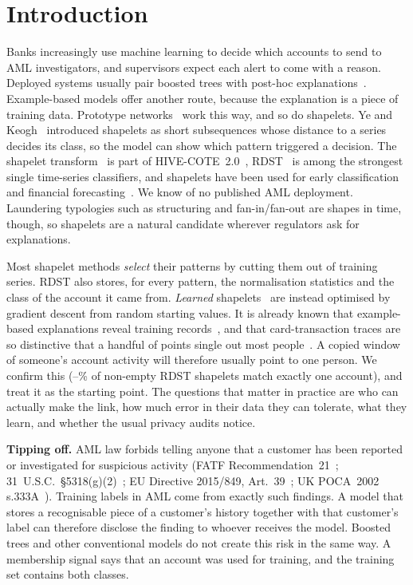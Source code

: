 \documentclass[sigconf,anonymous]{acmart}
\begin{document}
\section{Introduction}
Banks increasingly use machine learning to decide which accounts to send to AML investigators, and supervisors expect each alert to come with a reason. Deployed systems usually pair boosted trees with post-hoc explanations~\cite{tertychnyi2022}. Example-based models offer another route, because the explanation is a piece of training data. Prototype networks~\cite{chen2019} work this way, and so do shapelets. Ye and Keogh~\cite{ye2009} introduced shapelets as short subsequences whose distance to a series decides its class, so the model can show which pattern triggered a decision. The shapelet transform~\cite{hills2014} is part of HIVE-COTE~2.0~\cite{hc2}, RDST~\cite{guillaume2022} is among the strongest single time-series classifiers, and shapelets have been used for early classification~\cite{xing2011} and financial forecasting~\cite{kim2025}. We know of no published AML deployment. Laundering typologies such as structuring and fan-in/fan-out are shapes in time, though, so shapelets are a natural candidate wherever regulators ask for explanations.

Most shapelet methods \emph{select} their patterns by cutting them out of training series. RDST also stores, for every pattern, the normalisation statistics and the class of the account it came from. \emph{Learned} shapelets~\cite{grabocka2014} are instead optimised by gradient descent from random starting values. It is already known that example-based explanations reveal training records~\cite{shokri2021}, and that card-transaction traces are so distinctive that a handful of points single out most people~\cite{demontjoye2015}. A copied window of someone's account activity will therefore usually point to one person. We confirm this (\uniqNZmin--\uniqNZmax\% of non-empty RDST shapelets match exactly one account), and treat it as the starting point. The questions that matter in practice are who can actually make the link, how much error in their data they can tolerate, what they learn, and whether the usual privacy audits notice.

\textbf{Tipping off.} AML law forbids telling anyone that a customer has been reported or investigated for suspicious activity (FATF Recommendation~21~\cite{fatf}; 31~U.S.C.~\S5318(g)(2)~\cite{usc}; EU Directive 2015/849, Art.~39~\cite{amld}; UK POCA~2002 s.333A~\cite{poca}). Training labels in AML come from exactly such findings. A model that stores a recognisable piece of a customer's history together with that customer's label can therefore disclose the finding to whoever receives the model. Boosted trees and other conventional models do not create this risk in the same way. A membership signal says that an account was used for training, and the training set contains both classes.
\end{document}
